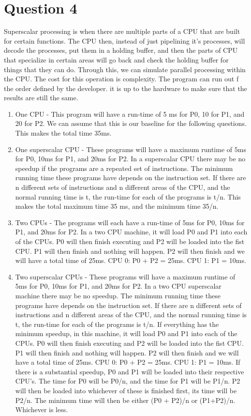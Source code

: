 \documentclass[12pt]{extarticle}
\begin{document}
	\section*{Question 4}
		Superscalar processing is when there are multiple parts of a CPU that are built for certain functions.  The CPU then, instead of just pipelining it's processes, will decode the processes, put them in a holding buffer, and then the parts of CPU that specialize in certain areas will go back and check the holding buffer for things that they can do.  Through this, we can simulate parallel processing within the CPU.  The cost for this operation is complexity.  The program can run out f the order defined by the developer.  it is up to the hardware to make sure that the results are still the same.
		\begin{enumerate}
			\item One CPU - This program will have a run-time of 5 ms for P0, 10 for P1, and 20 for P2.  We can assume that this is our baseline for the following questions.  This makes the total time 35ms.
			\item One superscalar CPU - These programs will have a maximum runtime of 5ms for P0, 10ms for P1, and 20ms for P2.  In a superscalar CPU there may be no speedup if the programs are a repeated set of instructions.  The minimum running time these programs have depends on the instruction set.  If there are n different sets of instructions and n different areas of the CPU, and the normal running time is t, the run-time for each of the programs is t/n.  This makes the total maximum time 35 ms, and the minimum time 35/n.
			\item Two CPUs - The programs will each have a run-time of 5ms for P0, 10ms for P1, and 20ms for P2.  In a two CPU machine, it will load P0 and P1 into each of the CPUs.  P0 will then finish executing and P2 will be loaded into the fist CPU.  P1 will then finish and nothing will happen.  P2 will then finish and we will have a total time of 25ms.  CPU 0: P0 + P2 = 25ms.  CPU 1: P1 = 10ms.
			\item Two superscalar CPUs - These programs will have a maximum runtime of 5ms for P0, 10ms for P1, and 20ms for P2.  In a two CPU superscalar machine there may be no speedup.  The minimum running time these programs have depends on the instruction set.  If there are n different sets of instructions and n different areas of the CPU, and the normal running time is t, the run-time for each of the programs is t/n.  If everything has the minimum speedup, in this machine, it will load P0 and P1 into each of the CPUs.  P0 will then finish executing and P2 will be loaded into the fist CPU.  P1 will then finish and nothing will happen.  P2 will then finish and we will have a total time of 25ms.  CPU 0: P0 + P2 = 25ms.  CPU 1: P1 = 10ms.  If there is a substantial speedup, P0 and P1 will be loaded into their respective CPU's.  The time for P0 will be P0/n, and the time for P1 will be P1/n.  P2 will then be loaded into whichever of these is finished first, its time will be P2/n.  The minimum time will then be either (P0 + P2)/n or (P1+P2)/n.  Whichever is less.
		\end{enumerate}
\end{document}
